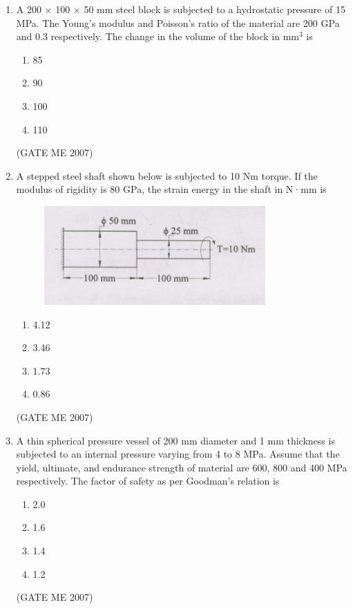 \documentclass[journal]{IEEEtran}
\begin{document}
\begin{enumerate}
\item A 200 × 100 × 50 mm steel block is subjected to a hydrostatic pressure of 15 MPa. The Young’s modulus and Poisson’s ratio of the material are 200 GPa and 0.3 respectively. The change in the volume of the block in mm\(^3\) is
\begin{multicols}{4}
\begin{enumerate}
\item 85
\item 90
\item 100
\item 110
\end{enumerate}
\end{multicols}
\hfill (GATE ME 2007)

\item A stepped steel shaft shown below is subjected to 10 Nm torque. If the modulus of rigidity is 80 GPa, the strain energy in the shaft in N·mm is

\begin{figure}[H]
    \centering
    \includegraphics[width=0.8\textwidth]{Fig 4.png}
    \caption{}
    \label{fig:question45}
\end{figure}

\begin{multicols}{4}
\begin{enumerate}
\item 4.12
\item 3.46
\item 1.73
\item 0.86
\end{enumerate}
\end{multicols}
\hfill (GATE ME 2007)

\item A thin spherical pressure vessel of 200 mm diameter and 1 mm thickness is subjected to an internal pressure varying from 4 to 8 MPa. Assume that the yield, ultimate, and endurance strength of material are 600, 800 and 400 MPa respectively. The factor of safety as per Goodman’s relation is
\begin{multicols}{4}
\begin{enumerate}
\item 2.0
\item 1.6
\item 1.4
\item 1.2
\end{enumerate}
\end{multicols}
\hfill (GATE ME 2007)


\end{enumerate}
\end{document}
